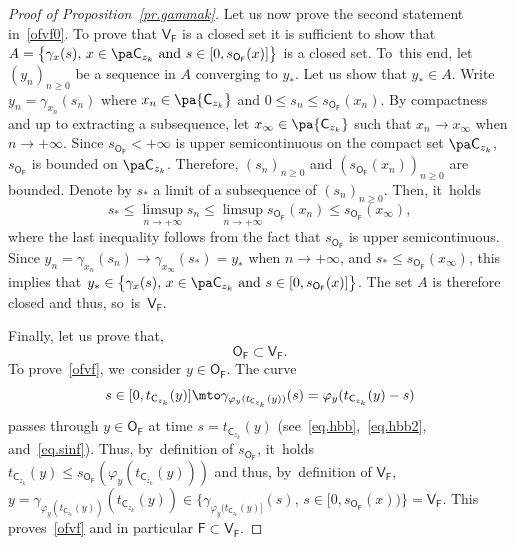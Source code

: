\begin{proof}[Proof of Proposition~\ref{pr.gammak}]
Let us now prove the second statement in~\eqref{ofvf0}. To prove that $\mathsf V_{\mathsf F}$ is a closed set it is sufficient to show that $A= \big \{ \gamma_x(s), \, x\in \pa \mathsf C_{z_k} \text{ and } s\in [0,s_{\mathsf O_{\mathsf F}}(x)]\big \}$ is a closed set. To~this end, let $(y_n)_{n\ge 0}$ be a sequence in $A$ converging to $y_*$. Let us show that $y_*\in A$. Write $y_n=\gamma_{x_n}(s_n)$ where $x_n \in \pa { \mathsf C_{z_k}}$ and $0\le s_n\le s_{\mathsf O_{\mathsf F}}(x_n)$. By compactness and up to extracting a subsequence, let $x_{\infty}\in \pa { \mathsf C_{z_k}}$ such that $x_n\to x_{\infty}$ when $n\to +\infty$. Since $s_{\mathsf O_{\mathsf F}}<+\infty$ is upper semicontinuous on the compact set $\pa \mathsf C_{z_k}$, $s_{\mathsf O_{\mathsf F}}$ is bounded on $\pa \mathsf C_{z_k}$. Therefore, $(s_n)_{n\ge 0}$ and $(s_{\mathsf O_{\mathsf F}}(x_n))_{n\ge 0}$ are bounded. Denote by $s_{*}$ a limit of a subsequence of $(s_n)_{n\ge 0}$. Then, it~holds
\[
s_*\le \limsup_{n\to +\infty }s_n \le \limsup_{n\to +\infty }s_{\mathsf O_{\mathsf F}}(x_n) \le s_{\mathsf O_{\mathsf F}}(x_{\infty}),
\]
where the last inequality follows from the fact that $s_{\mathsf
O_{\mathsf F}}$ is upper semicontinuous. Since $y_n=
\gamma_{x_n}(s_n)\to \gamma_{x_{\infty}}(s_*)=y_*$ when $n\to
+\infty$, and $s_*\le s_{\mathsf O_{\mathsf F}}(x_{\infty})$, this
implies that $y_*\in \big \{ \gamma_x(s), \, x\in \pa \mathsf C_{z_k}
\text{ and } s\in [0,s_{\mathsf O_{\mathsf F}}(x)]\big \}$. The set
$A$ is therefore closed and thus, so~is~$\mathsf V_{\mathsf F}$.

Finally, let us prove that,
\begin{equation}\label{ofvf}
{\mathsf O_{\mathsf F}}\subset \mathsf V_{\mathsf F}.
\end{equation}
To prove~\eqref{ofvf}, we~consider $y\in \mathsf O_{\mathsf F}$.
The curve
\[
s\in [0,t_{\mathsf C_{z_k}}(y)] \mto \gamma_{\varphi_y(t_{\mathsf C_{z_k}}(y))}(s)= \varphi_y(t_{\mathsf C_{z_k}}(y)-s)
\]
passes through $y\in \mathsf O_{\mathsf F}$ at time $s=t_{\mathsf C_{z_k}}(y)$ (see~\eqref{eq.hbb},~\eqref{eq.hbb2}, and~\eqref{eq.sinf}). Thus, by~definition of $s_{\mathsf O_{\mathsf F}}$, it~holds $t_{\mathsf C_{z_k}}(y)\le s_{\mathsf O_{\mathsf F}}(\varphi_y(t_{\mathsf C_{z_k}}(y)))$ and thus, by~definition of $\mathsf V_{\mathsf F}$,
$y=\gamma_{\varphi_y(t_{\mathsf C_{z_k}}(y))}(t_{\mathsf C_{z_k}}(y))\in \{ \gamma_{\varphi_y(t_{\mathsf C_{z_k}}(y)]}(s),\, s \in [0,s_{\mathsf O_{\mathsf F}}(x))\}= \mathsf V_{\mathsf F}$.
This proves~\eqref{ofvf} and in particular $\mathsf F\subset\mathsf V_{\mathsf F}$.


\end{proof}

